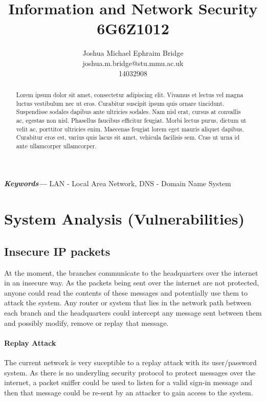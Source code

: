 \documentclass[11pt]{article}
\title{\vspace{2cm}\textbf{Information and Network Security}\\6G6Z1012}
\author{Joshua Michael Ephraim Bridge\\joshua.m.bridge@stu.mmu.ac.uk\\14032908}
\providecommand{\keywords}[1] {
  \small
  \textbf{\textit{Keywords---}} #1
}
\begin{document}
  \maketitle

  \vspace{1cm}

  \begin{abstract}
    Lorem ipsum dolor sit amet, consectetur adipiscing elit. Vivamus et lectus vel magna luctus vestibulum nec ut eros. Curabitur suscipit ipsum quis ornare tincidunt. Suspendisse sodales dapibus ante ultricies sodales. Nam nisl erat, cursus at convallis ac, egestas non nisl. Phasellus faucibus efficitur feugiat. Morbi lectus purus, dictum ut velit ac, porttitor ultricies enim. Maecenas feugiat lorem eget mauris aliquet dapibus. Curabitur eros est, varius quis lacus sit amet, vehicula facilisis sem. Cras ut urna id ante ullamcorper ullamcorper.
  \end{abstract}

  \vspace{0.5cm}

  \keywords{LAN - Local Area Network, DNS - Domain Name System}

  \newpage


  \section{System Analysis (Vulnerabilities)}
    \subsection{Insecure IP packets}
      At the moment, the branches communicate to the headquarters over the internet in an insecure way. As the packets being sent over the internet are not protected, anyone could read the contents of these messages and potentially use them to attack the system. Any router or system that lies in the network path between each branch and the headquarters could intercept any message sent between them and possibly modify, remove or replay that message.

      \paragraph{Replay Attack}
        The current network is very suceptible to a replay attack with its user/password system. As there is no underyling security protocol to protect messages over the internet, a packet sniffer could be used to listen for a valid sign-in message and then that message could be re-sent by an attacker to gain access to the system.
\end{document}
